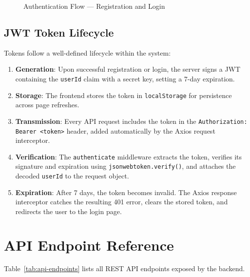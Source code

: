 \documentclass[12pt,a4paper]{report}
\begin{document}
\begin{figure}[H]
    \caption{Authentication Flow --- Registration and Login}
    \label{fig:authflow}
\end{figure}

\subsection{JWT Token Lifecycle}
Tokens follow a well-defined lifecycle within the system:

\begin{enumerate}[noitemsep]
    \item \textbf{Generation}: Upon successful registration or login, the server signs a JWT containing the \texttt{userId} claim with a secret key, setting a 7-day expiration.
    \item \textbf{Storage}: The frontend stores the token in \texttt{localStorage} for persistence across page refreshes.
    \item \textbf{Transmission}: Every API request includes the token in the \texttt{Authorization: Bearer <token>} header, added automatically by the Axios request interceptor.
    \item \textbf{Verification}: The \texttt{authenticate} middleware extracts the token, verifies its signature and expiration using \texttt{jsonwebtoken.verify()}, and attaches the decoded \texttt{userId} to the request object.
    \item \textbf{Expiration}: After 7 days, the token becomes invalid. The Axios response interceptor catches the resulting 401 error, clears the stored token, and redirects the user to the login page.
\end{enumerate}

\section{API Endpoint Reference}

Table~\ref{tab:api-endpoints} lists all REST API endpoints exposed by the backend.
\end{document}
